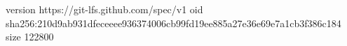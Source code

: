 version https://git-lfs.github.com/spec/v1
oid sha256:210d9ab931dfeceeee936374006cb99fd19ee885a27e36e69e7a1cb3f386c184
size 122800
